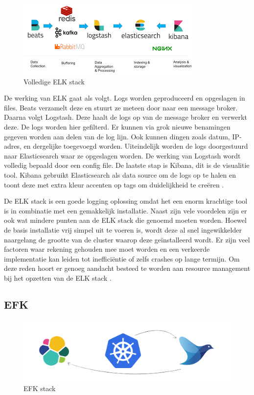 \begin{figure}[ht]
    \centering
    \includegraphics[scale=1]{img/elk-proces}
    \caption[Volledige ELK stack]{Volledige ELK stack \cite{berman2018-12}}
\end{figure}

De werking van ELK gaat als volgt. Logs worden geproduceerd en opgeslagen in files. Beats verzamelt deze en stuurt ze meteen door naar een message broker. Daarna volgt Logstash. Deze haalt de logs op van de message broker en verwerkt deze. De logs worden hier gefilterd. Er kunnen via grok nieuwe benamingen gegeven worden aan delen van de log lijn. Ook kunnen dingen zoals datum, IP-adres, en dergelijke toegevoegd worden. Uiteindelijk worden de logs doorgestuurd naar Elasticsearch waar ze opgeslagen worden. De werking van Logstash wordt volledig bepaald door een config file. De laatste stap is Kibana, dit is de visualitie tool. Kibana gebruikt Elasticsearch als data source om de logs op te halen en toont deze met extra kleur accenten op tags om duidelijkheid te creëren \cite{levy2015,berman2018-12}. 

De ELK stack is een goede logging oplossing omdat het een enorm krachtige tool is in combinatie met een gemakkelijk installatie. Naast zijn vele voordelen zijn er ook wat mindere punten aan de ELK stack die genoemd moeten worden. Hoewel de basis installatie vrij simpel uit te voeren is, wordt deze al snel ingewikkelder naargelang de grootte van de cluster waarop deze geïnstalleerd wordt. Er zijn veel factoren waar rekening gehouden mee moet worden en een verkeerde implementatie kan leiden tot inefficiëntie of zelfs crashes op lange termijn. Om deze reden hoort er genoeg aandacht besteed te worden aan resource management bij het opzetten van de ELK stack \autocite{gifford2016}.

\subsection{EFK}
\label{subsec:EFK}

\begin{figure}[ht]
    \centering
    \includegraphics[scale=0.15 ]{img/EFK_logo}
    \caption[EFK stack]{EFK stack \cite{petrausch}}
\end{figure}

